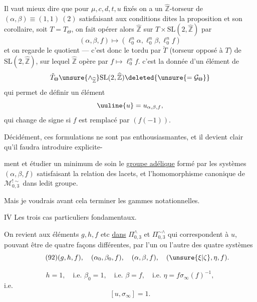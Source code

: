 Il vaut mieux dire que pour $\mu,c,d,t,u$ fixés on a un $\widehat{\mathbb Z}$-torseur de $(\alpha,\beta)\equiv(1,1)\ (2)$ satisfaisant aux conditions dites  la proposition  et son corollaire, soit $T=T_\Theta$, on fait opérer alors $\widehat{\mathbb Z}$  sur $T\times\mathrm{SL}(2,\widehat{\mathbb Z})$ par
\[
 (\alpha,\beta,f)\longmapsto
 (\ell_0^n\alpha,\ell_0^n\beta,\ell_0^n f)
\]
et on regarde le quotient --- c'est donc le tordu par $\check T$ (torseur opposé à $T$) de $\mathrm{SL}(2,\widehat{\mathbb Z})$, sur lequel $\widehat{\mathbb Z}$ opère par $f\longmapsto\ell_0^n f$.  c'est la donnée d'un élément  de
\[
 \check T_\Theta\unsure{\mathbin{\wedge}_{\widehat{\mathbb Z}}}\mathrm{SL}(2,\widehat{\mathbb Z})
 \deleted{\unsure{=\mathcal G_\Theta}}
\]
qui permet de définir un élément
\[
 \uuline{u}=u_{\alpha,\beta,f},
\]
qui change de signe si $f$ est remplacé par $(f(-1))$.

Décidément, ces formulations ne sont pas enthousiasmantes, et il devient clair qu'il faudra introduire explicite-


ment et étudier  un minimum de soin le \uline{groupe adélique} formé par les systèmes $(\alpha,\beta,f)$ satisfaisant la relation des lacets, et  l'homomorphisme canonique de $\mathcal M_{0,3}^{!\sim}$ dans ledit groupe.

Mais je voudrais avant cela terminer les gammes notationnelles.



\uline{$\overline{\mathrm{IV}}$} Les trois cas particuliers fondamentaux.

On revient aux éléments $g,h,f$ etc \uline{dans} $\Pi_{0,3}^{\wedge}$ et $\Pi_{0,3}^{\sim\wedge}$ qui correspondent à $u$, pouvant être  de quatre façons différentes, par l'un ou l'autre des quatre systèmes
\[
\tag{92}
 (g,h,f),\quad(\alpha_0,\beta_0,f),\quad(\alpha,\beta,f),\quad(\unsure{\xi|\zeta},\eta,f).
\]

\[
\tag{93}
 h=1,\quad\text{i.e. }\beta_0=1,\quad\text{i.e. }\beta=f,\quad
 \text{i.e. }\eta=f\sigma_\infty(f)^{-1},
\]
i.e.
\[
\tag{94}
 [u,\sigma_\infty]=1.
\]

